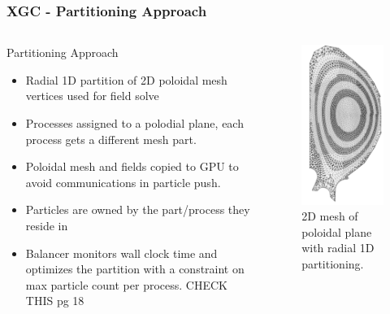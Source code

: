 \documentclass[aspectratio=169]{beamer}
\begin{document}
\begin{frame}
  \frametitle{XGC - Partitioning Approach}
  \begin{columns}
    \begin{column}{0.5\textwidth}
      Partitioning Approach
      \begin{itemize}
        \item Radial 1D partition of 2D poloidal mesh vertices used for field solve
        \item Processes assigned to a polodial plane, each process gets a
          different mesh part.
        \item Poloidal mesh and fields copied to GPU to avoid
          communications in particle push.
        \item Particles are owned by the part/process they reside in
        \item Balancer monitors wall clock time and optimizes the
          partition with a constraint on max particle count per process.
          CHECK THIS pg 18
      \end{itemize}
    \end{column}
    \begin{column}{0.5\textwidth}
      \begin{figure}
        \centering
        \includegraphics[width=.4\textwidth]{figures/xgcSpiralMesh.png} \\
        \small{2D mesh of poloidal plane with radial 1D partitioning.}
      \end{figure}
    \end{column}
  \end{columns}
\end{frame}
\end{document}
